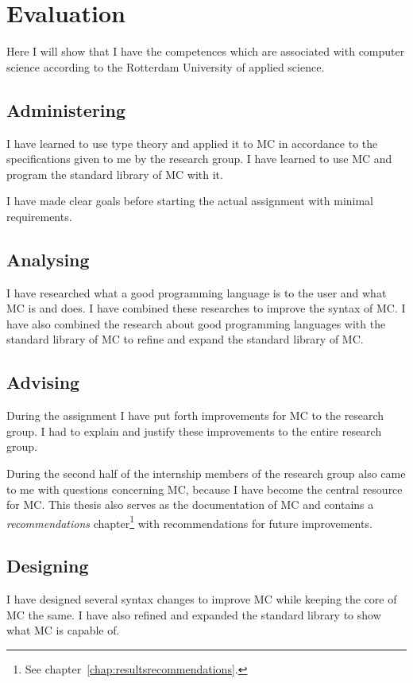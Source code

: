 \chapter{Evaluation}
Here I will show that I have the competences which are associated with computer science according to the Rotterdam University of applied science.


\section{Administering}
I have learned to use type theory and applied it to MC in accordance to the specifications given to me by the research group.
I have learned to use MC and program the standard library of MC with it.

I have made clear goals before starting the actual assignment with minimal requirements.


\section{Analysing}
I have researched what a good programming language is to the user and what MC is and does.
I have combined these researches to improve the syntax of MC.
I have also combined the research about good programming languages with the standard library of MC to refine and expand the standard library of MC.


\section{Advising}
During the assignment I have put forth improvements for MC to the research group.
I had to explain and justify these improvements to the entire research group.

During the second half of the internship members of the research group also came to me with questions concerning MC, because I have become the central resource for MC.
This thesis also serves as the documentation of MC and contains a \emph{recommendations} chapter\footnote{See chapter~\ref{chap:resultsrecommendations}.} with recommendations for future improvements.


\section{Designing}
I have designed several syntax changes to improve MC while keeping the core of MC the same.
I have also refined and expanded the standard library to show what MC is capable of.


